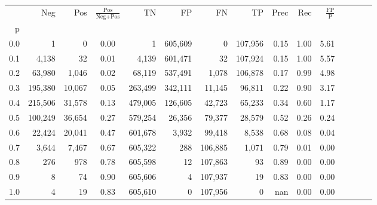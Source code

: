 \begin{tabular}{rrrcrrrrrrrrrrr}
\toprule
{} &      Neg &     Pos & $\frac{\text{Pos}}{\text{Neg}+\text{Pos}}$ &       TN &       FP &       FN &       TP &  Prec &   Rec & $\frac{\text{FP}}{\text{P}}$ \\
p   &          &         &                                            &          &          &          &          &       &       &                              \\
\midrule
0.0 &        1 &       0 &                                       0.00 &        1 &  605,609 &        0 &  107,956 &  0.15 &  1.00 &                         5.61 \\
0.1 &    4,138 &      32 &                                       0.01 &    4,139 &  601,471 &       32 &  107,924 &  0.15 &  1.00 &                         5.57 \\
0.2 &   63,980 &   1,046 &                                       0.02 &   68,119 &  537,491 &    1,078 &  106,878 &  0.17 &  0.99 &                         4.98 \\
0.3 &  195,380 &  10,067 &                                       0.05 &  263,499 &  342,111 &   11,145 &   96,811 &  0.22 &  0.90 &                         3.17 \\
0.4 &  215,506 &  31,578 &                                       0.13 &  479,005 &  126,605 &   42,723 &   65,233 &  0.34 &  0.60 &                         1.17 \\
0.5 &  100,249 &  36,654 &                                       0.27 &  579,254 &   26,356 &   79,377 &   28,579 &  0.52 &  0.26 &                         0.24 \\
0.6 &   22,424 &  20,041 &                                       0.47 &  601,678 &    3,932 &   99,418 &    8,538 &  0.68 &  0.08 &                         0.04 \\
0.7 &    3,644 &   7,467 &                                       0.67 &  605,322 &      288 &  106,885 &    1,071 &  0.79 &  0.01 &                         0.00 \\
0.8 &      276 &     978 &                                       0.78 &  605,598 &       12 &  107,863 &       93 &  0.89 &  0.00 &                         0.00 \\
0.9 &        8 &      74 &                                       0.90 &  605,606 &        4 &  107,937 &       19 &  0.83 &  0.00 &                         0.00 \\
1.0 &        4 &      19 &                                       0.83 &  605,610 &        0 &  107,956 &        0 &   nan &  0.00 &                         0.00 \\
\bottomrule
\end{tabular}
